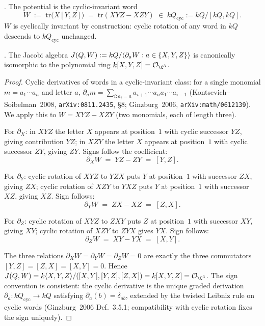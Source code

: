 \begin{definition}
\label{opus:def:cubic-potential}
\ClaimStatusDefinition. The potential is the cyclic-invariant word
\[
 W \;:=\; \mathrm{tr}\bigl(X[Y,Z]\bigr) \;=\; \mathrm{tr}(XYZ - XZY) \;\in\; kQ_{\mathrm{cyc}} := kQ/[kQ,kQ].
\]
$W$ is cyclically invariant by construction: cyclic rotation of any word
in $kQ$ descends to $kQ_{\mathrm{cyc}}$ unchanged.
\end{definition}

\begin{proposition}
\label{opus:prop:jacobi-is-C3}
\ClaimStatusDerivation.
The Jacobi algebra $J(Q, W) := kQ / \langle \partial_a W : a \in \{X, Y, Z\}\rangle$
is canonically isomorphic to the polynomial ring $k[X, Y, Z] = \mathcal{O}_{\C^3}$.
\end{proposition}

\begin{proof}
Cyclic derivatives of words in a cyclic-invariant class: for a single monomial
$m = a_1 \cdots a_n$ and letter $a$,
$\partial_a m = \sum_{i : a_i = a} a_{i+1} \cdots a_n a_1 \cdots a_{i-1}$
(Kontsevich--Soibelman~2008, \texttt{arXiv:0811.2435}, \S8;
Ginzburg~2006, \texttt{arXiv:math/0612139}). We apply this to
$W = XYZ - XZY$ (two monomials, each of length three).

For $\partial_X$: in $XYZ$ the letter $X$ appears at position~$1$ with cyclic
successor $YZ$, giving contribution $YZ$; in $XZY$ the letter $X$ appears at
position~$1$ with cyclic successor $ZY$, giving $ZY$. Signs follow the coefficient:
\[
 \partial_X W \;=\; YZ - ZY \;=\; [Y, Z].
\]

For $\partial_Y$: cyclic rotation of $XYZ$ to $YZX$ puts $Y$ at position~$1$
with successor $ZX$, giving $ZX$; cyclic rotation of $XZY$ to $YXZ$ puts $Y$ at
position~$1$ with successor $XZ$, giving $XZ$. Sign follows:
\[
 \partial_Y W \;=\; ZX - XZ \;=\; [Z, X].
\]

For $\partial_Z$: cyclic rotation of $XYZ$ to $ZXY$ puts $Z$ at position~$1$
with successor $XY$, giving $XY$; cyclic rotation of $XZY$ to $ZYX$ gives $YX$.
Sign follows:
\[
 \partial_Z W \;=\; XY - YX \;=\; [X, Y].
\]

The three relations $\partial_X W = \partial_Y W = \partial_Z W = 0$ are exactly the
three commutators $[Y,Z] = [Z,X] = [X,Y] = 0$. Hence $\Jac(Q, W) = k\langle X, Y, Z\rangle/
([X,Y], [Y,Z], [Z,X]) = k[X, Y, Z] = \mathcal{O}_{\C^3}$. The sign convention is
consistent: the cyclic derivative is the unique graded derivation
$\partial_a : kQ_{\mathrm{cyc}} \to kQ$ satisfying $\partial_a(b) = \delta_{ab}$,
extended by the twisted Leibniz rule on cyclic words (Ginzburg~2006 Def.~3.5.1;
compatibility with cyclic rotation fixes the sign uniquely).
\end{proof}

